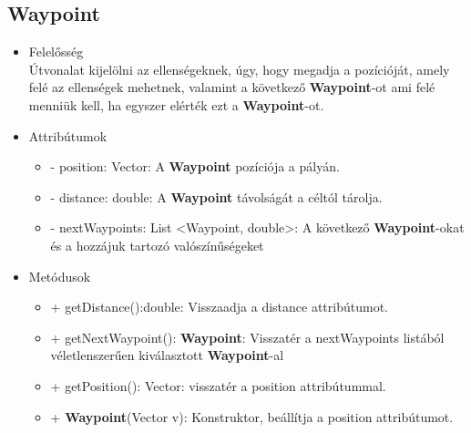 \subsection{Waypoint}
\begin{itemize}
\item Felelősség\\
Útvonalat kijelölni az ellenségeknek, úgy, hogy megadja a pozícióját, amely felé az ellenségek mehetnek, valamint a következő  \textbf{Waypoint}-ot ami felé menniük kell, ha egyszer elérték ezt a  \textbf{Waypoint}-ot.
\item Attribútumok
	\begin{itemize}
		\item - position: Vector: A \textbf{Waypoint} pozíciója a pályán.
		\item - distance: double: A  \textbf{Waypoint} távolságát a céltól tárolja.
		\item - nextWaypoints: List <Waypoint, double>: A következő  \textbf{Waypoint}-okat és a hozzájuk tartozó valószínűségeket
	\end{itemize}
\item Metódusok
	\begin{itemize}
		\item + getDistance():double: Visszaadja a distance attribútumot.
		\item + getNextWaypoint(): \textbf{Waypoint}: Visszatér a nextWaypoints listából véletlenszerűen kiválasztott \textbf{Waypoint}-al
		\item + getPosition(): Vector: visszatér a position attribútummal.
		\item + \textbf{Waypoint}(Vector v): Konstruktor, beállítja a position attribútumot. 
	\end{itemize}
\end{itemize}

